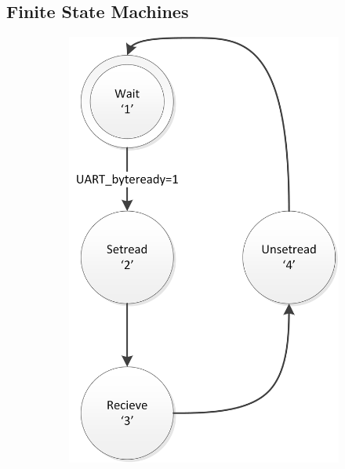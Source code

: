 \documentclass{report}
\begin{document}
\begin{appendices}
\chapter{Finite State Machines}
\label{sec:statemachines}
\begin{figure}[H]
\centering
\caption{De FSM's op de FPGA}
\begin{subfigure}{0.40\linewidth}
\label{fig:fsmReceiver}
\includegraphics[width=\linewidth]{FSMReceiver}
\end{subfigure}
\quad
\begin{subfigure}{0.40\linewidth}
\label{fig:fsmSender}

\end{subfigure}
\end{figure}
\end{appendices}
\end{document}
